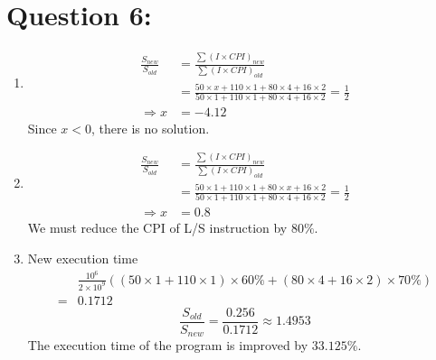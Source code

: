 \documentclass[12pt,a4paper]{article}
\begin{document}
\section*{Question 6:}
\begin{enumerate}[label=\alph*.]
  \item%
        \begin{align*}
          \frac{S_{new}}{S_{old}} & = \frac{\sum {(I \times CPI)}_{new}}{\sum {(I \times CPI)}_{old}}                                                                     \\
                                  & = \frac{50 \times x + 110 \times 1 + 80 \times 4 + 16 \times 2}{50 \times 1 + 110 \times 1 + 80 \times 4 + 16 \times 2} = \frac{1}{2} \\
          \Rightarrow x           & = -4.12
        \end{align*}
        Since \(x < 0\), there is no solution.
  \item%
        \begin{align*}
          \frac{S_{new}}{S_{old}} & = \frac{\sum {(I \times CPI)}_{new}}{\sum {(I \times CPI)}_{old}}                                                                     \\
                                  & = \frac{50 \times 1 + 110 \times 1 + 80 \times x + 16 \times 2}{50 \times 1 + 110 \times 1 + 80 \times 4 + 16 \times 2} = \frac{1}{2} \\
          \Rightarrow x           & = 0.8
        \end{align*}
        We must reduce the CPI of L/S instruction by \(80\%\).
  \item%
        New execution time
        \begin{align*}
            & \frac{10^6}{2 \times 10^9}((50 \times 1 + 110 \times 1) \times 60\% + (80 \times 4 + 16 \times 2) \times 70\%) \\
          = & 0.1712
        \end{align*}
        \begin{equation*}
          \frac{S_{old}}{S_{new}} = \frac{0.256}{0.1712} \approx 1.4953
        \end{equation*}
        The execution time of the program is improved by \(33.125\%\).
\end{enumerate}
\end{document}
